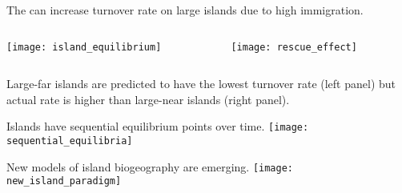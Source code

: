 \documentclass[t,handout]{beamer}  %
\begin{document}
\begin{frame}{The  can increase turnover rate on large islands due to high immigration.}
	\centering
	\begin{columns}[T]
		\begin{column}{0.4\textwidth}
			\texttt{[image: island\_equilibrium]}
		\end{column}
		\begin{column}{0.6\textwidth}
			\texttt{[image: rescue\_effect]}
		\end{column}
	\end{columns}

	\raggedright
	
	\hangpara Large-far islands are predicted to have the lowest turnover rate (left panel) but actual rate is higher than large-near islands (right panel).
	

\end{frame}

\begin{frame}{Islands have sequential equilibrium points over time.}
	\centering
		\texttt{[image: sequential\_equilibria]}
\end{frame}


\begin{frame}{New models of island biogeography are emerging.}
	\centering
			\texttt{[image: new\_island\_paradigm]}
\end{frame}
\end{document}
